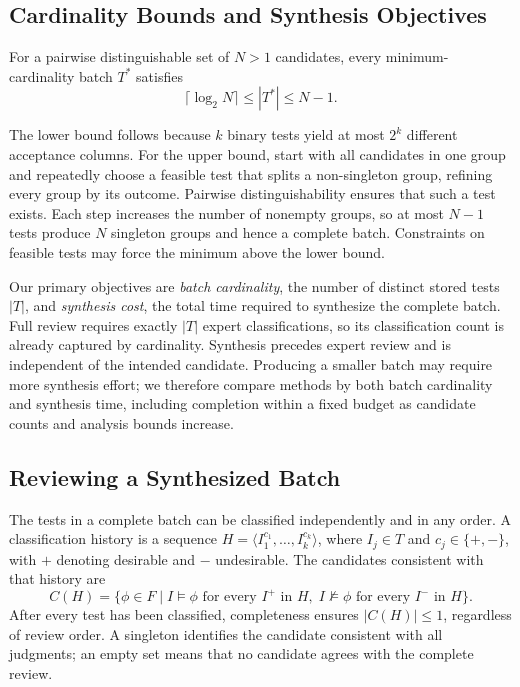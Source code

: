 \documentclass[runningheads]{llncs}
\begin{document}
\subsection{Cardinality Bounds and Synthesis Objectives}

\begin{proposition}
\label{prop:batch-bounds}
For a pairwise distinguishable set of $N>1$ candidates, every minimum-cardinality batch
$T^*$ satisfies
\[
  \lceil\log_2N\rceil\leq |T^*|\leq N-1.
\]
\end{proposition}

The lower bound follows because $k$ binary tests yield at most $2^k$
different acceptance columns. For the upper bound, start with all candidates
in one group and repeatedly choose a feasible test that splits a non-singleton
group, refining every group by its outcome. Pairwise distinguishability
ensures that such a test exists. Each step increases the number of nonempty
groups, so at most $N-1$ tests produce $N$ singleton groups and hence a
complete batch. Constraints on feasible tests may force the minimum above
the lower bound.

Our primary objectives are \emph{batch cardinality}, the number of distinct
stored tests $|T|$, and \emph{synthesis cost}, the total time required to
synthesize the complete batch. Full review requires exactly $|T|$ expert
classifications, so its classification count is already captured by
cardinality. Synthesis precedes expert review and is independent of the
intended candidate. Producing a smaller batch may require more synthesis
effort; we therefore compare methods by both batch cardinality and synthesis
time, including completion within a fixed budget as candidate counts and
analysis bounds increase.

\subsection{Reviewing a Synthesized Batch}

The tests in a complete batch can be classified independently and in any
order. A classification history is a sequence
$H=\langle I_1^{c_1},\ldots,I_k^{c_k}\rangle$, where $I_j\in T$ and
$c_j\in\{+,-\}$, with $+$ denoting desirable and $-$ undesirable. The
candidates consistent with that history are
\[
  C(H)=\{\phi\in F \mid
    I\models\phi \text{ for every } I^+\text{ in }H,\;
    I\not\models\phi \text{ for every } I^-\text{ in }H\}.
\]
After every test has been classified, completeness ensures $|C(H)|\leq 1$,
regardless of review order. A singleton identifies the candidate consistent
with all judgments; an empty set means that no candidate agrees with the
complete review.
\end{document}
